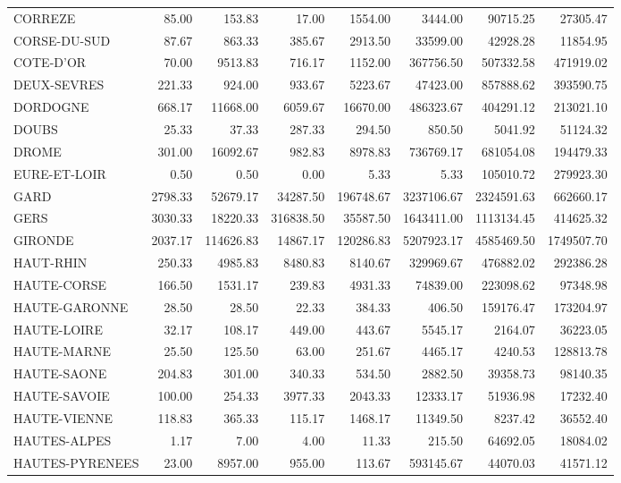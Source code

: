 \documentclass[11pt, a4paper]{article}
\begin{document}
\begin{tabular}{lrrrrrrr}
  CORREZE & 85.00 & 153.83 & 17.00 & 1554.00 & 3444.00 & 90715.25 & 27305.47 \\ 
  CORSE-DU-SUD & 87.67 & 863.33 & 385.67 & 2913.50 & 33599.00 & 42928.28 & 11854.95 \\ 
  COTE-D'OR & 70.00 & 9513.83 & 716.17 & 1152.00 & 367756.50 & 507332.58 & 471919.02 \\ 
  DEUX-SEVRES & 221.33 & 924.00 & 933.67 & 5223.67 & 47423.00 & 857888.62 & 393590.75 \\ 
  DORDOGNE & 668.17 & 11668.00 & 6059.67 & 16670.00 & 486323.67 & 404291.12 & 213021.10 \\ 
  DOUBS & 25.33 & 37.33 & 287.33 & 294.50 & 850.50 & 5041.92 & 51124.32 \\ 
  DROME & 301.00 & 16092.67 & 982.83 & 8978.83 & 736769.17 & 681054.08 & 194479.33 \\ 
  EURE-ET-LOIR & 0.50 & 0.50 & 0.00 & 5.33 & 5.33 & 105010.72 & 279923.30 \\ 
  GARD & 2798.33 & 52679.17 & 34287.50 & 196748.67 & 3237106.67 & 2324591.63 & 662660.17 \\ 
  GERS & 3030.33 & 18220.33 & 316838.50 & 35587.50 & 1643411.00 & 1113134.45 & 414625.32 \\ 
  GIRONDE & 2037.17 & 114626.83 & 14867.17 & 120286.83 & 5207923.17 & 4585469.50 & 1749507.70 \\ 
  HAUT-RHIN & 250.33 & 4985.83 & 8480.83 & 8140.67 & 329969.67 & 476882.02 & 292386.28 \\ 
  HAUTE-CORSE & 166.50 & 1531.17 & 239.83 & 4931.33 & 74839.00 & 223098.62 & 97348.98 \\
  HAUTE-GARONNE & 28.50 & 28.50 & 22.33 & 384.33 & 406.50 & 159176.47 & 173204.97 \\ 
  HAUTE-LOIRE & 32.17 & 108.17 & 449.00 & 443.67 & 5545.17 & 2164.07 & 36223.05 \\
  HAUTE-MARNE & 25.50 & 125.50 & 63.00 & 251.67 & 4465.17 & 4240.53 & 128813.78 \\ 
  HAUTE-SAONE & 204.83 & 301.00 & 340.33 & 534.50 & 2882.50 & 39358.73 & 98140.35 \\ 
  HAUTE-SAVOIE & 100.00 & 254.33 & 3977.33 & 2043.33 & 12333.17 & 51936.98 & 17232.40 \\ 
  HAUTE-VIENNE & 118.83 & 365.33 & 115.17 & 1468.17 & 11349.50 & 8237.42 & 36552.40 \\
  HAUTES-ALPES & 1.17 & 7.00 & 4.00 & 11.33 & 215.50 & 64692.05 & 18084.02 \\
  HAUTES-PYRENEES & 23.00 & 8957.00 & 955.00 & 113.67 & 593145.67 & 44070.03 & 41571.12 \\ 

\end{tabular}
\end{document}
